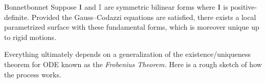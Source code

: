 % 
% 
% 
% 




\begin{thm}{Bonnet}{bonnet}
Suppose $\mathrm{I}$ and $\mathbb{I}$ are symmetric bilinear forms where $\mathrm{I}$ is positive-definite. Provided the Gauss--Codazzi equations are satisfied, there exists a local parametrized surface with these fundamental forms, which is moreover unique up to rigid motions.
\end{thm}

Everything ultimately depends on a generalization of the existence/uniqueness theorem for ODE known as the \emph{Frobenius Theorem.} Here is a rough sketch of how the process works. 

